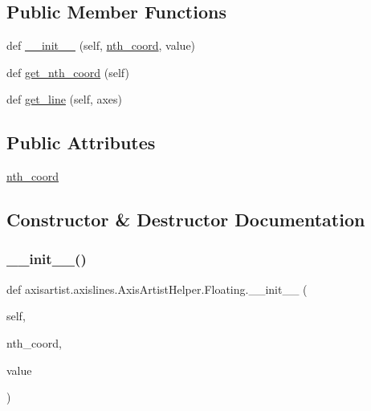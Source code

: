 \subsection*{Public Member Functions}
\begin{DoxyCompactItemize}
\item 
def \hyperlink{classaxisartist_1_1axislines_1_1AxisArtistHelper_1_1Floating_a07dd445cb342627743b927a561af31cf}{\+\_\+\+\_\+init\+\_\+\+\_\+} (self, \hyperlink{classaxisartist_1_1axislines_1_1AxisArtistHelper_1_1Floating_a7d1a07d19192ee261521cffad7b43fa3}{nth\+\_\+coord}, value)
\item 
def \hyperlink{classaxisartist_1_1axislines_1_1AxisArtistHelper_1_1Floating_adafc69a770d1a32aff9fffe9fee65a43}{get\+\_\+nth\+\_\+coord} (self)
\item 
def \hyperlink{classaxisartist_1_1axislines_1_1AxisArtistHelper_1_1Floating_a2bd5817959c85135d067ee81b8050de8}{get\+\_\+line} (self, axes)
\end{DoxyCompactItemize}
\subsection*{Public Attributes}
\begin{DoxyCompactItemize}
\item 
\hyperlink{classaxisartist_1_1axislines_1_1AxisArtistHelper_1_1Floating_a7d1a07d19192ee261521cffad7b43fa3}{nth\+\_\+coord}
\end{DoxyCompactItemize}


\subsection{Constructor \& Destructor Documentation}
\mbox{\label{classaxisartist_1_1axislines_1_1AxisArtistHelper_1_1Floating_a07dd445cb342627743b927a561af31cf}} 
\subsubsection{\texorpdfstring{\+\_\+\+\_\+init\+\_\+\+\_\+()}{\_\_init\_\_()}}
{\footnotesize\ttfamily def axisartist.\+axislines.\+Axis\+Artist\+Helper.\+Floating.\+\_\+\+\_\+init\+\_\+\+\_\+ (\begin{DoxyParamCaption}\item[{}]{self,  }\item[{}]{nth\+\_\+coord,  }\item[{}]{value }\end{DoxyParamCaption})}



